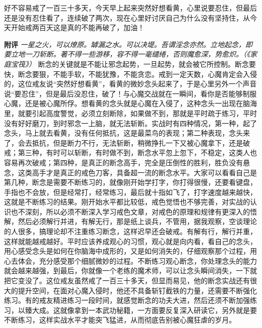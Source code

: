 \begin{case}
    好不容易戒了一百三十多天，今天早上起来突然好想看黄，心里说要忍住，但最后还是没有忍住看了，连续破了两次，现在心里好讨厌自己为什么没有坚持住，从今天开始戒两百天这是真的不能再破了，加油！

    \textbf{附评} \textit{一星之火，可以燎原。罅漏之水。可以决堤。吾谓淫念亦然。立地起念，即要立地一刀斩断。著不得一些游移，容不得一毫缱绻，否则魔愈深，势愈炽。（《家庭宝筏》）} 断念的关键就是不能让邪念起势，一旦起势，就会被它所控制。断念要快，断念要狠，不能手软，不能犹豫，不能贪恋。戒到一定天数，心魔肯定会入侵的，这位戒友说“突然好想看黄”，看黄的微妙念头起来了，于是心里另外一个声音说“要忍住”，但是最后没忍住，破了！与心魔交战就在一瞬间，看你是否能够制服心魔，还是被心魔所俘。想看黄的念头就是心魔在入侵了，这种念头一出现在脑海里，就要引起高度警觉，必须立刻断除，如果做不到，那就是平时疏于练习，平时没有好好磨刀，到时邪念一上脑，就无法斩断。实战时有四种情况，第一种，起了念头，马上就去看黄，没有任何抵抗，这是最菜鸟的表现；第二种表现，念头来了，会去抵抗，但是断力不行，无法斩断，稍微挣扎一下又被心魔拿下，还是破戒；第三种，有时可以斩断，有时做不到，断念水平忽上忽下，不稳定，这类人也容易再次破戒；第四种，是真正的断念高手，完全是压倒性的胜利，胜负没有悬念，这类高手才是真正的戒色刀客，具备超一流的断念水平。大家可以看看自己是第几种，断念是需要不断练习的，就像刚开始学打字，你打得很慢，还要看键盘，手指也不会放，但是经常打，经常练习，最后就十指如飞了，打字速度越来越快，这就是不断练习的结果。刚开始水平都比较低，戒色觉悟也不够完善，对实战的认识也不深刻，所以必须不断深入学习戒色文章，对戒色的原理和规律有更深入的悟解，然后必须解行并进，有解无行，那是纸上谈兵，不管用，据我观察，空谈理论的人很多，搞理论却不注重练习断念，这样迟早还会破戒。有解有行，解行并重，这样就能越戒越好。平时应该养成观心的习惯，观心就是向内看，看自己的念头，用心感受念头是如何在你脑海中成形的，又是如何消失的，仔细观察那个过程，用心去体会，充分感受那个细腻微妙的过程。不断练习观心断念，你处理念头的能力就会越来越强，到最后，你就像一个老练的魔术师，可以让念头瞬间消失，一下就把它变没了。这位戒友虽然戒了一百三十多天，但显而易见，他的断念实战还有很大的提升空间，在面对心魔入侵时，他还不具备斩钉截铁的力量，还需要不断强化练习。有的戒友精进练习一段时间，就感觉断念的功夫大进，然后还须不断加强练习，以臻大成。这就像拿到一本武功秘籍，一方面要反复深入研读它，另外就是要不断练习，这样实战水平才能突飞猛进，从而彻底告别被心魔狂虐的岁月。
\end{case}


